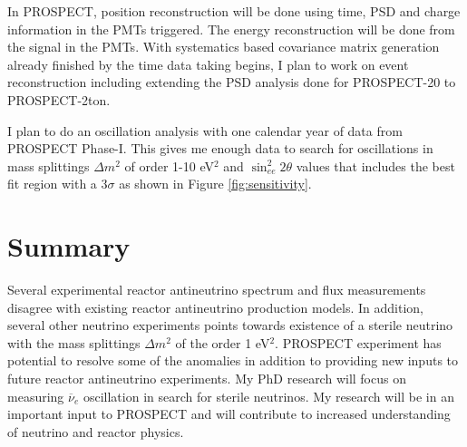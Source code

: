 \documentclass[11pt]{article}
\newcommand{\nuebar}{\ensuremath{\overline{\nu }_{e}} \hspace{1pt}}
\numberwithin{equation}{section}
\begin{document}
In PROSPECT, position reconstruction will be done using time, PSD and charge information in the PMTs triggered. The energy reconstruction will be done from the signal in the PMTs. With systematics based covariance matrix generation already finished by the time data taking begins, I plan to work on event reconstruction including extending the PSD analysis done for PROSPECT-20 to PROSPECT-2ton. 

I plan to do an oscillation analysis with one calendar year of data from PROSPECT Phase-I. This gives me enough data to search for oscillations in mass splittings $\Delta m^2 $ of order 1-10 eV$^2$ and $\sin^{2}_{ee}2 \theta$ values that includes the best fit region with a 3$\sigma$ as shown in Figure \ref{fig:sensitivity}.

\section{Summary}
Several experimental reactor antineutrino spectrum and flux measurements disagree with existing reactor antineutrino production models. In addition, several other neutrino experiments points towards existence of a sterile neutrino with the mass splittings $\Delta m^2$ of the order 1 eV$^2$. PROSPECT experiment has potential to resolve some of the anomalies in addition to providing new inputs to future reactor antineutrino experiments. My PhD research will focus on measuring \nuebar oscillation in search for sterile neutrinos. My research will be in an important input to PROSPECT and will contribute to increased understanding of neutrino and reactor physics.



\end{document}
